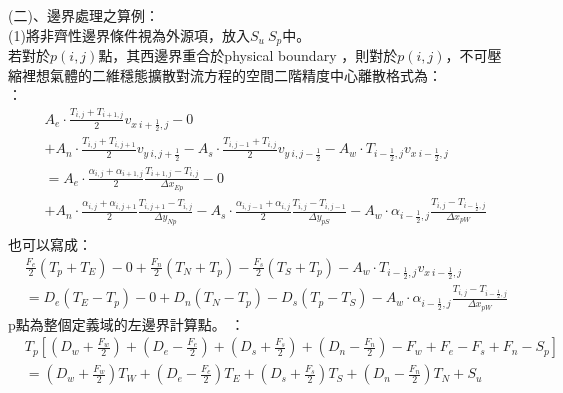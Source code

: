 \documentclass[12pt]{article}
\begin{document}
\noindent (二)、邊界處理之算例：\\

\noindent (1)將非齊性邊界條件視為外源項，放入$S_{u}\ S_{p}$中。\\
若對於$p(i,j)$點，其西邊界重合於physical boundary ，則對於$p(i,j)$，不可壓縮裡想氣體的二維穩態擴散對流方程的空間二階精度中心離散格式為：\\
\noindent [通用式]： 
\begin{equation}
\begin{split}
  &A_{e} \cdot \frac{T_{i,j} + T_{i+1,j}}{2} v_{x\ i+\frac{1}{2},j} - 0 \\
  &+ A_{n} \cdot \frac{T_{i,j} + T_{i,j+1}}{2} v_{y\ i,j+\frac{1}{2}} - A_{s} \cdot \frac{T_{i,j-1} + T_{i,j}}{2} v_{y\ i,j-\frac{1}{2}}- A_{w} \cdot T_{i-\frac{1}{2},j}v_{x\ i-\frac{1}{2},j} \\
  &= A_{e} \cdot \frac{\alpha_{i,j} + \alpha_{i+1,j}}{2}\frac{T_{i+1,j}-T_{i,j}}{\Delta x_{Ep}}- 0 \\
  &+ A_{n} \cdot \frac{\alpha_{i,j} + \alpha_{i,j+1}}{2}\frac{T_{i,j+1}-T_{i,j}}{\Delta y_{Np}} - A_{s} \cdot \frac{\alpha_{i,j-1} + \alpha_{i,j}}{2}\frac{T_{i,j}-T_{i,j-1}}{\Delta y_{pS}} - A_{w} \cdot \alpha_{i-\frac{1}{2},j} \frac{T_{i,j}-T_{i-\frac{1}{2},j}}{\Delta x_{pW}}\\
\end{split}
\end{equation}
\noindent 也可以寫成： 
\begin{equation}
\begin{split}
  &\frac{F_{e}}{2}(T_{p} + T_{E})- 0 +\frac{F_{n}}{2}(T_{N} + T_{p})-\frac{F_{s}}{2}(T_{S} + T_{p}) - A_{w} \cdot T_{i-\frac{1}{2},j}v_{x\ i-\frac{1}{2},j} \\
  & = D_{e} (T_{E}-T_{p} ) - 0 + D_{n} (T_{N}-T_{p}) - D_{s} (T_{p}-T_{S}) - A_{w} \cdot \alpha_{i-\frac{1}{2},j} \frac{T_{i,j}-T_{i-\frac{1}{2},j}}{\Delta x_{pW}}
\end{split}
\end{equation}
\noindent p點為整個定義域的左邊界計算點。
\noindent [通用公式]：
\begin{equation}
\begin{split}
  &T_{p}\left[(D_{w}+\frac{F_{w}}{2})+(D_{e}-\frac{F_{e}}{2})+(D_{s}+\frac{F_{s}}{2})+(D_{n}-\frac{F_{n}}{2}) - F_{w} + F_{e} - F_{s} + F_{n}  - S_{p}\right] \\
  &= (D_{w}+\frac{F_{w}}{2})T_{W}+(D_{e}-\frac{F_{e}}{2})T_{E}+(D_{s}+\frac{F_{s}}{2})T_{S}+(D_{n}-\frac{F_{n}}{2})T_{N} + S_{u}
\end{split}
\end{equation}
\end{document}
